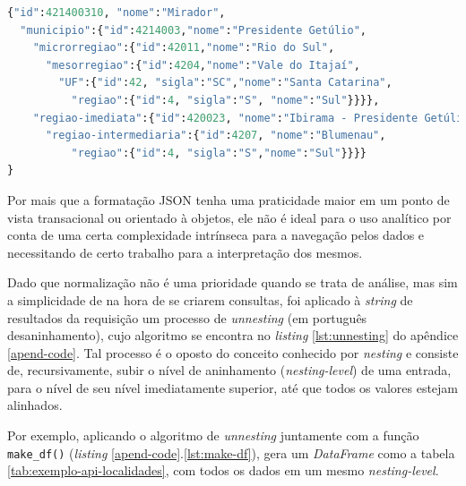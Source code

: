 \begin{lstlisting}[float = h, label={lst:exemplo-api-localidades},language=Python, caption=Exemplo de resultado de uma requisição da API de localidades.]
{"id":421400310, "nome":"Mirador",
  "municipio":{"id":4214003,"nome":"Presidente Getúlio",
    "microrregiao":{"id":42011,"nome":"Rio do Sul",
      "mesorregiao":{"id":4204,"nome":"Vale do Itajaí",
        "UF":{"id":42, "sigla":"SC","nome":"Santa Catarina",
          "regiao":{"id":4, "sigla":"S", "nome":"Sul"}}}},
    "regiao-imediata":{"id":420023, "nome":"Ibirama - Presidente Getúlio",
      "regiao-intermediaria":{"id":4207, "nome":"Blumenau",
          "regiao":{"id":4, "sigla":"S","nome":"Sul"}}}}
}
\end{lstlisting}


    Por mais que a formatação JSON tenha uma praticidade maior em um ponto de vista transacional ou orientado à objetos, ele não é ideal para o uso analítico por conta de uma certa complexidade intrínseca para a navegação pelos dados e necessitando de certo trabalho para a interpretação dos mesmos. 
    
    Dado que normalização não é uma prioridade quando se trata de análise, mas sim a simplicidade de na hora de se criarem consultas, foi aplicado à \textit{string} de resultados da requisição um processo de \textit{unnesting} (em português desaninhamento), cujo algoritmo se encontra no \textit{listing} \ref{lst:unnesting} do apêndice \ref{apend-code}. Tal processo é o oposto do conceito conhecido por \textit{nesting} e consiste de, recursivamente, subir o nível de aninhamento (\textit{nesting-level}) de uma entrada, para o nível de seu nível imediatamente superior, até que todos os valores estejam alinhados.

    Por exemplo, aplicando o algoritmo de \textit{unnesting} juntamente com a função \verb|make_df()| (\textit{listing} \ref{apend-code}.\ref{lst:make-df}), gera um \textit{DataFrame} como a tabela \ref{tab:exemplo-api-localidades}, com todos os dados em um mesmo \textit{nesting-level}.


